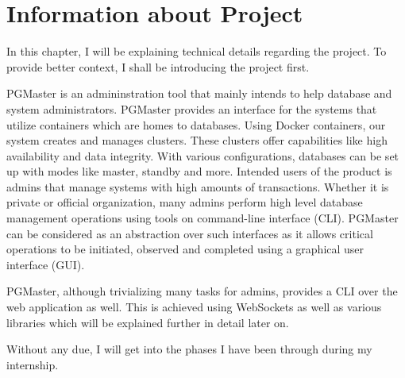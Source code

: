 \chapter{Information about Project}
In this chapter, I will be explaining technical details regarding the 
project. To provide better context, I shall be introducing the project first. 
\par
PGMaster is an admininstration tool that mainly intends to help database and 
system administrators. PGMaster provides an interface for the systems that 
utilize containers which are homes to databases. Using Docker containers, our 
system creates and manages clusters. These clusters offer capabilities like 
high availability and data integrity. With various configurations, databases 
can be set up with modes like master, standby and more. Intended users of the 
product is admins that manage systems with high amounts of transactions. 
Whether it is private or official organization, many admins perform high level 
database management operations using tools on command-line interface (CLI). 
PGMaster can be considered as an abstraction over such interfaces as it allows 
critical operations to be initiated, observed and completed using a graphical 
user interface (GUI).
\par
PGMaster, although trivializing many tasks for admins, provides a CLI over the 
web application as well. This is achieved using WebSockets as well as various 
libraries which will be explained further in detail later on.
\par
Without any due, I will get into the phases I have been through during my 
internship.

